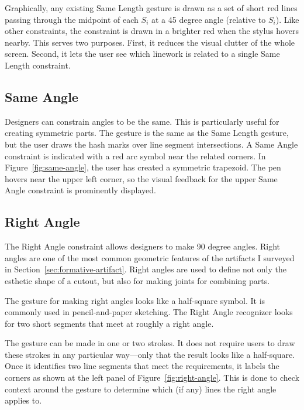 Graphically, any existing Same Length gesture is drawn as a set of
short red lines passing through the midpoint of each $S_i$ at a 45
degree angle (relative to $S_i$). Like other constraints, the
constraint is drawn in a brighter red when the stylus hovers
nearby. This serves two purposes. First, it reduces the visual clutter
of the whole screen. Second, it lets the user see which linework is
related to a single Same Length constraint. 

\subsection{Same Angle}

Designers can constrain angles to be the same. This is particularly
useful for creating symmetric parts. The gesture is the same as the
Same Length gesture, but the user draws the hash marks over line
segment intersections. A Same Angle constraint is indicated with a red
arc symbol near the related corners. In Figure~\ref{fig:same-angle},
the user has created a symmetric trapezoid. The pen hovers near the
upper left corner, so the visual feedback for the upper Same Angle
constraint is prominently displayed.



\subsection{Right Angle}

The Right Angle constraint allows designers to make 90 degree
angles. Right angles are one of the most common geometric features of
the artifacts I surveyed in
Section~\ref{sec:formative-artifact}. Right angles are used to define
not only the esthetic shape of a cutout, but also for making joints
for combining parts.

The gesture for making right angles looks like a half-square
symbol. It is commonly used in pencil-and-paper sketching. The Right
Angle recognizer looks for two short segments that meet at roughly a
right angle. 

The gesture can be made in one or two strokes. It does not require
users to draw these strokes in any particular way---only that the
result looks like a half-square. Once it identifies two line segments
that meet the requirements, it labels the corners as shown at the left
panel of Figure~\ref{fig:right-angle}. This is done to check context
around the gesture to determine which (if any) lines the right angle
applies to.

